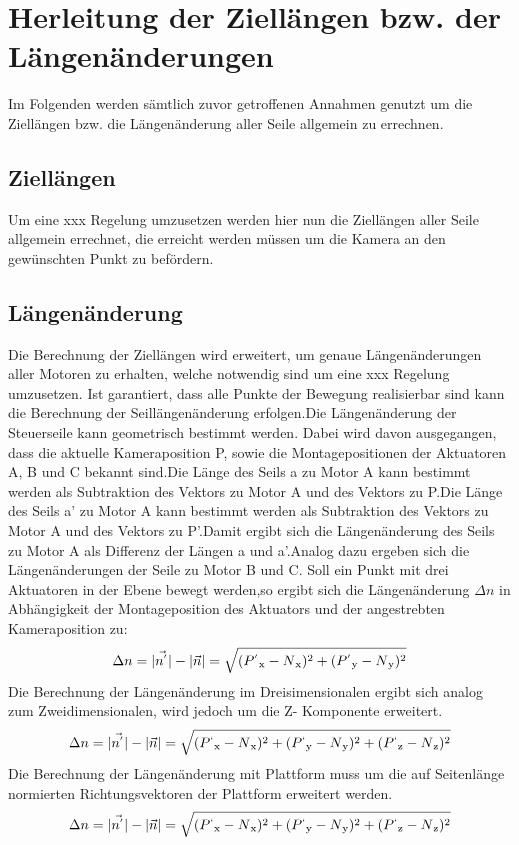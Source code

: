 \section{Herleitung der Ziellängen bzw. der Längenänderungen}
	Im Folgenden werden sämtlich zuvor getroffenen Annahmen genutzt um die Ziellängen bzw. die Längenänderung aller Seile allgemein zu errechnen.
		\subsection{Ziellängen}
		Um eine xxx Regelung umzusetzen werden hier nun die Ziellängen aller Seile allgemein errechnet, die erreicht werden müssen um die Kamera an den gewünschten Punkt zu befördern.
		\subsection{Längenänderung}
			Die Berechnung der Ziellängen wird erweitert, um genaue Längenänderungen aller Motoren zu erhalten, welche notwendig sind um eine xxx Regelung umzusetzen.
			Ist garantiert, dass alle Punkte der Bewegung realisierbar sind kann die Berechnung der Seillängenänderung erfolgen.Die Längenänderung der Steuerseile kann geometrisch bestimmt werden.
			Dabei wird davon ausgegangen, dass die aktuelle Kameraposition P, sowie die Montagepositionen der Aktuatoren A, B und C bekannt sind.Die Länge des Seils a zu Motor A kann bestimmt werden als Subtraktion des Vektors zu Motor A und des Vektors zu P.Die Länge des Seils a' zu Motor A kann bestimmt werden als Subtraktion des Vektors zu Motor A und des Vektors zu P'.Damit ergibt sich die Längenänderung des Seils zu Motor A als Differenz der Längen a und a'.Analog dazu ergeben sich die Längenänderungen der Seile zu Motor B und C.
			Soll ein Punkt mit drei Aktuatoren in der Ebene bewegt werden,so ergibt sich die Längenänderung $\Delta n$ in Abhängigkeit der Montageposition des Aktuators und der angestrebten Kameraposition zu:
			\begin{align}
				\Delta n =
				|\vec{n^{'}}|-|\vec{n}|=
				\sqrt	{
						(P^{'}\textsubscript{x}-N\textsubscript{x})^2+
						(P^{'}\textsubscript{y}-N\textsubscript{y})^2
						}
			\end{align}
			Die Berechnung der Längenänderung im Dreisimensionalen ergibt sich analog zum Zweidimensionalen, wird jedoch um die Z- Komponente erweitert.
			\begin{align}
				\Delta n =
				|\vec{n^{'}}|-|\vec{n}|=
				\sqrt	{
						(P^{`}\textsubscript{x}-N\textsubscript{x})^2+
						(P^{`}\textsubscript{y}-N\textsubscript{y})^2+
						(P^{`}\textsubscript{z}-N\textsubscript{z})^2
						}
			\end{align}	
			Die Berechnung der Längenänderung mit Plattform muss um die auf Seitenlänge normierten Richtungsvektoren der Plattform erweitert werden.
			\begin{align}
				\Delta n =
				|\vec{n^{'}}|-|\vec{n}|=
				\sqrt	{
						(P^{`}\textsubscript{x}-N\textsubscript{x})^2+
						(P^{`}\textsubscript{y}-N\textsubscript{y})^2+
						(P^{`}\textsubscript{z}-N\textsubscript{z})^2
						}
			\end{align}
	\pagebreak
